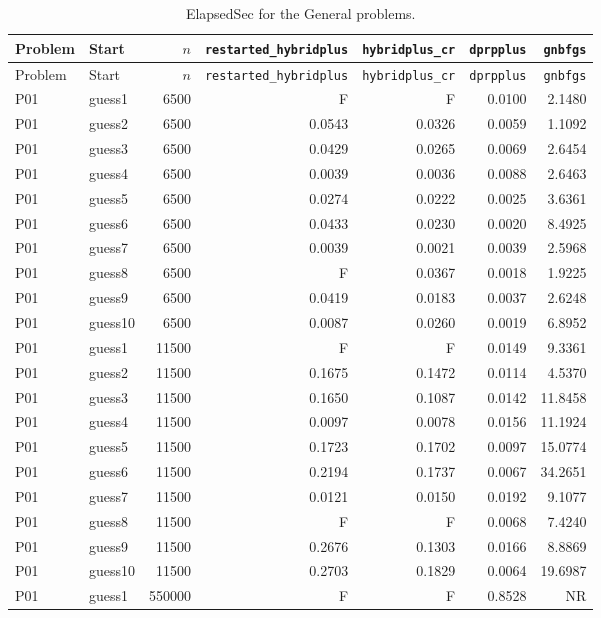 {\footnotesize
\begin{longtable}{llrrrrr}
\caption{ElapsedSec for the General problems.}\label{tab:general_elapsed_seconds}\\
\toprule Problem & Start & $n$ & \texttt{restarted\_hybridplus} & \texttt{hybridplus\_cr} & \texttt{dprpplus} & \texttt{gnbfgs} \\
\midrule
\endfirsthead
\toprule Problem & Start & $n$ & \texttt{restarted\_hybridplus} & \texttt{hybridplus\_cr} & \texttt{dprpplus} & \texttt{gnbfgs} \\
\midrule
\endhead
\bottomrule
\endfoot
P01 & guess1 & 6500 & F & F & 0.0100 & 2.1480 \\
P01 & guess2 & 6500 & 0.0543 & 0.0326 & 0.0059 & 1.1092 \\
P01 & guess3 & 6500 & 0.0429 & 0.0265 & 0.0069 & 2.6454 \\
P01 & guess4 & 6500 & 0.0039 & 0.0036 & 0.0088 & 2.6463 \\
P01 & guess5 & 6500 & 0.0274 & 0.0222 & 0.0025 & 3.6361 \\
P01 & guess6 & 6500 & 0.0433 & 0.0230 & 0.0020 & 8.4925 \\
P01 & guess7 & 6500 & 0.0039 & 0.0021 & 0.0039 & 2.5968 \\
P01 & guess8 & 6500 & F & 0.0367 & 0.0018 & 1.9225 \\
P01 & guess9 & 6500 & 0.0419 & 0.0183 & 0.0037 & 2.6248 \\
P01 & guess10 & 6500 & 0.0087 & 0.0260 & 0.0019 & 6.8952 \\
P01 & guess1 & 11500 & F & F & 0.0149 & 9.3361 \\
P01 & guess2 & 11500 & 0.1675 & 0.1472 & 0.0114 & 4.5370 \\
P01 & guess3 & 11500 & 0.1650 & 0.1087 & 0.0142 & 11.8458 \\
P01 & guess4 & 11500 & 0.0097 & 0.0078 & 0.0156 & 11.1924 \\
P01 & guess5 & 11500 & 0.1723 & 0.1702 & 0.0097 & 15.0774 \\
P01 & guess6 & 11500 & 0.2194 & 0.1737 & 0.0067 & 34.2651 \\
P01 & guess7 & 11500 & 0.0121 & 0.0150 & 0.0192 & 9.1077 \\
P01 & guess8 & 11500 & F & F & 0.0068 & 7.4240 \\
P01 & guess9 & 11500 & 0.2676 & 0.1303 & 0.0166 & 8.8869 \\
P01 & guess10 & 11500 & 0.2703 & 0.1829 & 0.0064 & 19.6987 \\
P01 & guess1 & 550000 & F & F & 0.8528 & NR \\

\end{longtable}}
